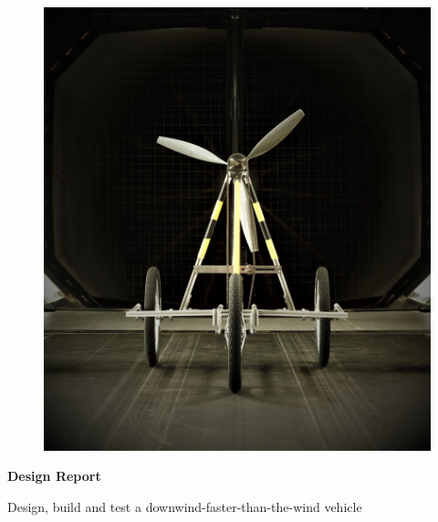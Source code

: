 
\vfill\null
\vspace{2cm}

\begin{figure}[H]
    \centering
    \includegraphics[width=\linewidth]{images/frontpage.jpg}
    \label{fig:frontpage}
\end{figure}

\vfill\null

\newpage


\noindent \textbf{Design Report}\\

\vspace{2cm}


\vspace{0.3cm}


\vspace{0.15cm}

\noindent Design, build and test a downwind-faster-than-the-wind vehicle
\vspace{1.5cm}

